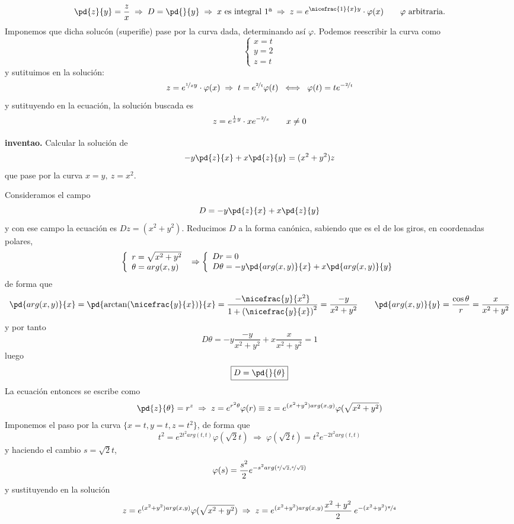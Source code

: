 \begin{sol}
    $$\pd{z}{y}=\dfrac{z}{x} \; \Rightarrow \; D=\pd{}{y} \; \Rightarrow \; x \text{ es integral 1ª} \; \Rightarrow \; z=e^{\nicefrac{1}{x} y} \cdot \varphi(x) \qquad \varphi \text{ arbitraria.}$$
    Imponemos que dicha solucón (superifie) pase por la curva dada, determinando así $\varphi$. Podemos reescribir la curva como
    $$\left\{ \begin{array}{l}
         x=t  \\
         y=2 \\
         z=t
    \end{array} \right.$$
    y sutituimos en la solución:
    $$z=e^{\nicefrac{1}{x} y} \cdot \varphi(x) \; \Rightarrow \; t=e^{\nicefrac{2}{t}}\varphi(t) \; \iff \; \varphi(t)=t e^{-\nicefrac{2}{t}}$$
    y sutituyendo en la ecuación, la solución buscada es
    $$z=e^{\frac{1}{x} y} \cdot x e^{-\nicefrac{2}{x}} \qquad x \neq 0 $$
\end{sol}
\begin{ejer}
    \textbf{inventao.} Calcular la solución de $$-y \pd{z}{x} + x \pd{z}{y}=(x^2+y^2)z$$ que pase por la curva $x=y,\: z=x^2$.
\end{ejer}
\begin{sol}
    Consideramos el campo 
    $$D=-y \pd{z}{x} + x \pd{z}{y}$$
    y con ese campo la ecuación es $Dz=(x^2+y^2)$. Reducimos $D$ a la forma canónica, sabiendo que es el de los giros, en coordenadas polares,
    $$\left\{ \begin{array}{l}
         r=\sqrt{x^2+y^2}  \\
         \theta=arg(x,y) 
    \end{array}\right. \; \Rightarrow \left\{ \begin{array}{l}
        Dr=0  \\
        D\theta=-y \pd{arg(x,y)}{x}+x\pd{arg(x,y)}{y}
    \end{array}\right.$$ 
    de forma que 
    $$\pd{arg(x,y)}{x}=\pd{\arctan(\nicefrac{y}{x})}{x}=\dfrac{-\nicefrac{y}{x^2}}{1+\left(\nicefrac{y}{x}\right)^2}=\dfrac{-y}{x^2+y^2} \qquad \pd{arg(x,y)}{y}=\dfrac{\cos \theta}{r}=\dfrac{x}{x^2+y^2}$$
    y por tanto $$D\theta = -y \dfrac{-y}{x^2+y^2} + x \dfrac{x}{x^2+y^2}=1$$
    luego 
    $$\boxed{D=\pd{}{\theta}}$$
    La ecuación entonces se escribe como
    $$\pd{z}{\theta}=r^z \; \Rightarrow \; z=e^{r^2 \theta} \varphi(r) \equiv  z=e^{(x^2+y^2) arg(x,y)} \varphi(\sqrt{x^2+y^2}) $$
    Imponemos el paso por la curva $\{x=t,y=t,z=t^2\}$, de forma que
    $$t^2=e^{2t^2 arg(t,t)} \varphi(\sqrt{2}t) \; \Rightarrow \;  \varphi(\sqrt{2}t)=t^2 e^{-2t^2arg(t,t)}$$
    y haciendo el cambio $s=\sqrt{2}t$, 
    $$\varphi(s)=\dfrac{s^2}{2} e^{-s^2arg\left(\nicefrac{s}{\sqrt{2}},\nicefrac{s}{\sqrt{2}}\right)}$$ 
    y sustituyendo en la solución
    $$z=e^{(x^2+y^2) arg(x,y)} \varphi(\sqrt{x^2+y^2}) \; \Rightarrow \; z=e^{(x^2+y^2) arg(x,y)} \dfrac{x^2+y^2}{2} \: e^{-(x^2+y^2)\nicefrac{\pi}{4}}$$
\end{sol}
